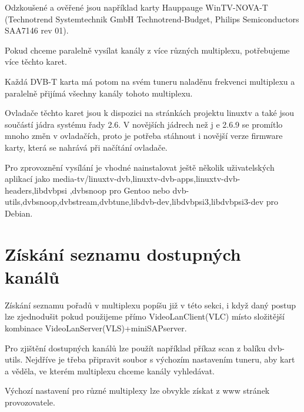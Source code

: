 Odzkoušené a ověřené jsou například karty Hauppauge WinTV-NOVA-T (Technotrend Systemtechnik GmbH Technotrend-Budget, Philips Semiconductors SAA7146 rev 01).

Pokud chceme paralelně vysílat kanály z více různých multiplexu, potřebujeme více těchto karet.

Každá DVB-T karta má potom na svém tuneru naladěnu frekvenci multiplexu a paralelně přijímá všechny kanály tohoto multiplexu.

\vspace{10pt}

Ovladače těchto karet jsou k dispozici na stránkách projektu linuxtv \cite{linuxtvURL} a také jsou součástí jádra systému řady 2.6. V novějších jádrech než j
e 2.6.9 se promítlo mnoho změn v ovladačích, proto je potřeba stáhnout i novější verze firmware karty, která se nahrává při načítání ovladače.

\vspace{10pt}

Pro zprovoznění vysílání je vhodné nainstalovat ještě několik uživatelských aplikací jako media-tv/linuxtv-dvb,linuxtv-dvb-apps,linuxtv-dvb-headers,libdvbpsi
,dvbsnoop pro Gentoo nebo dvb-utils,dvbsnoop,dvbstream,dvbtune,libdvb-dev,libdvbpsi3,libdvbpsi3-dev pro Debian.

\section{Získání seznamu dostupných kanálů}

Získání seznamu pořadů v multiplexu popíšu již v této sekci, i když daný postup lze zjednodušit pokud použijeme přímo VideoLanClient(VLC) místo složitější kombinace VideoLanServer(VLS)+miniSAPserver.

\vspace{10pt}

Pro zjištění dostupných kanálů lze použít například příkaz scan z balíku dvb-utils. Nejdříve je třeba připravit soubor s výchozím nastavením tuneru, aby kart
a věděla, ve kterém multiplexu chceme kanály vyhledávat.

\vspace{10pt}

Výchozí nastavení pro různé multiplexy lze obvykle získat z www stránek provozovatele.

\vspace{10pt}

